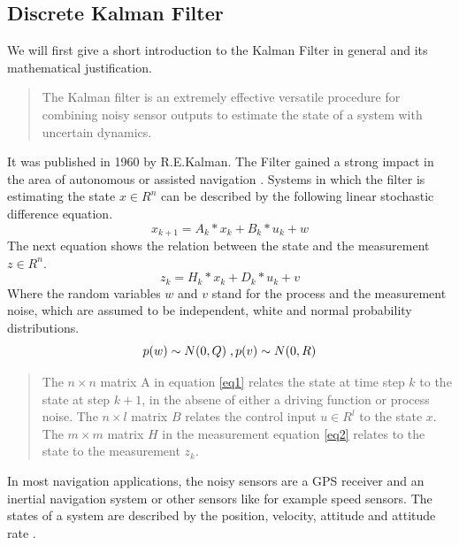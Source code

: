 \subsection*{Discrete Kalman Filter}
We will first give a short introduction to the Kalman Filter in general and its mathematical justification.
\begin{quote}The Kalman filter is an extremely effective versatile procedure for combining noisy sensor outputs to estimate the state of a system with uncertain dynamics.\cite{andrews2007}\end{quote} It was published in 1960 by R.E.Kalman. The Filter gained a strong impact in the area of autonomous or assisted navigation \cite{welch1997}. 
Systems in which the filter is estimating the state $x \in R^{n}$ can be described by the following linear stochastic difference equation.
\begin{equation}
x_{k+1}=A_k*x_k+B_k*u_k+w
\label{eq1}
\end{equation} The next equation shows the relation between the state and the measurement $z \in R^{n}$.
\begin{equation} 
z_k=H_k*x_k+D_k*u_k+v
\label{eq2}
\end{equation}
Where the random variables $w$ and $v$ stand for the process and the measurement noise, which are assumed to be independent, white and normal probability distributions.
\begin{equation}
p(w)\sim N(0,Q)\;, \\
p(v)\sim N(0,R)\label{R_Q_noise}
\end{equation}
\begin{quote}The $n\times n$ matrix A in equation \ref{eq1} relates the state at time step $k$ to the state at step $k+1$, in the absene of either a driving function or process noise. The $n\times l$ matrix $B$ relates the control input $u \in R^{l}$ to the state $x$. The $m \times m$ matrix $H$ in the measurement equation \ref{eq2} relates to the state to the measurement $z_k$.\cite{welch1997}\end{quote}
In most navigation applications, the noisy sensors are a GPS receiver and an inertial navigation system or other sensors like for example speed sensors. The states of a system are described by the position, velocity, attitude and attitude rate \cite{andrews2007}.

